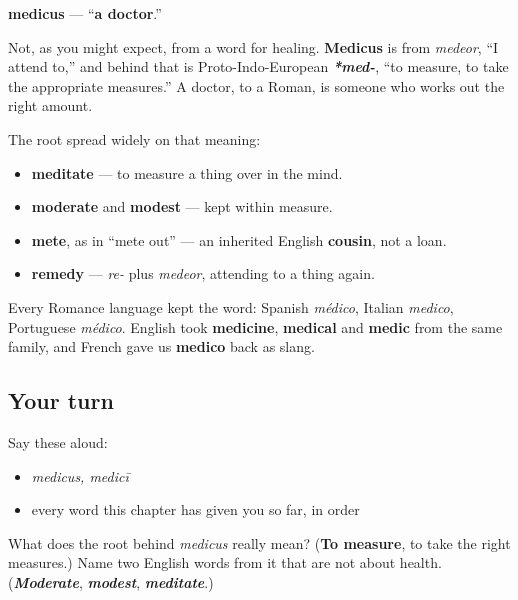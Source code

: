 \begin{cousinweb}
\textbf{medicus} — \textquotedblleft{}\textbf{a doctor}.\textquotedblright{}

Not, as you might expect, from a word for healing. \textbf{Medicus} is from \emph{medeor}, \textquotedblleft{}I attend to,\textquotedblright{} and behind that is Proto-Indo-European \emph{\textbf{*med-}}, \textquotedblleft{}to measure, to take the appropriate measures.\textquotedblright{} A doctor, to a Roman, is someone who works out the right amount.

The root spread widely on that meaning:

\begin{itemize}
\raggedright
  \item \textbf{meditate} — to measure a thing over in the mind.
  \item \textbf{moderate} and \textbf{modest} — kept within measure.
  \item \textbf{mete}, as in \textquotedblleft{}mete out\textquotedblright{} — an inherited English \textbf{cousin}, not a loan.
  \item \textbf{remedy} — \emph{re-} plus \emph{medeor}, attending to a thing again.
\end{itemize}

Every Romance language kept the word: Spanish \emph{médico}, Italian \emph{medico}, Portuguese \emph{médico}. English took \textbf{medicine}, \textbf{medical} and \textbf{medic} from the same family, and French gave us \textbf{medico} back as slang.
\end{cousinweb}

\subsection*{Your turn}
Say these aloud:

\begin{itemize}
\raggedright
  \item \emph{medicus, medicī}
  \item every word this chapter has given you so far, in order
\end{itemize}

\begin{tcolorbox}[breakable,colback=teal!4,colframe=teal!35!black,title={Before you move on}]
What does the root behind \emph{medicus} really mean? (\textbf{To measure}, to take the right measures.) Name two English words from it that are not about health. (\emph{\textbf{Moderate}}, \emph{\textbf{modest}}, \emph{\textbf{meditate}}.)
\end{tcolorbox}
